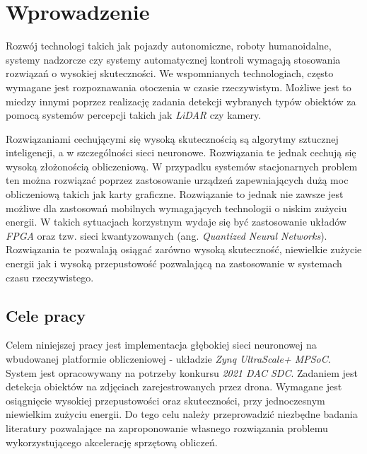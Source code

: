 \chapter{Wprowadzenie}
\label{cha:wprowadzenie}

Rozwój technologi takich jak pojazdy autonomiczne, roboty humanoidalne, systemy nadzorcze czy systemy automatycznej kontroli wymagają stosowania rozwiązań o wysokiej skuteczności.
We wspomnianych technologiach, często wymagane jest rozpoznawania otoczenia w czasie rzeczywistym.
Możliwe jest to miedzy innymi poprzez realizację zadania detekcji wybranych typów obiektów za pomocą systemów percepcji takich jak \emph{LiDAR} czy kamery. 

Rozwiązaniami cechującymi się wysoką skutecznością są algorytmy sztucznej inteligencji, a w szczególności sieci neuronowe.
Rozwiązania te jednak cechują się wysoką złożonością obliczeniową.
W przypadku systemów stacjonarnych problem ten można rozwiązać poprzez zastosowanie urządzeń zapewniających dużą moc obliczeniową takich jak karty graficzne.
Rozwiązanie to jednak nie zawsze jest możliwe dla zastosowań mobilnych wymagających technologii o niskim zużyciu energii.
W takich sytuacjach korzystnym wydaje się być zastosowanie układów \emph{FPGA}
oraz tzw. sieci kwantyzowanych (ang. \emph{Quantized Neural Networks}).
Rozwiązania te pozwalają osiągać zarówno wysoką skuteczność, niewielkie zużycie energii jak i wysoką przepustowość pozwalającą na zastosowanie w systemach czasu rzeczywistego.

\section{Cele pracy}
\label{sec:celePracy}
Celem niniejszej pracy jest implementacja głębokiej sieci neuronowej na wbudowanej platformie obliczeniowej - układzie \emph{Zynq UltraScale+ MPSoC}.
System jest opracowywany na potrzeby konkursu \emph{2021 DAC SDC}.
Zadaniem jest detekcja obiektów na zdjęciach zarejestrowanych przez drona. 
Wymagane jest osiągnięcie wysokiej przepustowości oraz skuteczności, przy jednoczesnym niewielkim zużyciu energii. 
Do tego celu należy przeprowadzić niezbędne badania literatury pozwalające na zaproponowanie własnego rozwiązania problemu wykorzystującego akcelerację sprzętową obliczeń.


